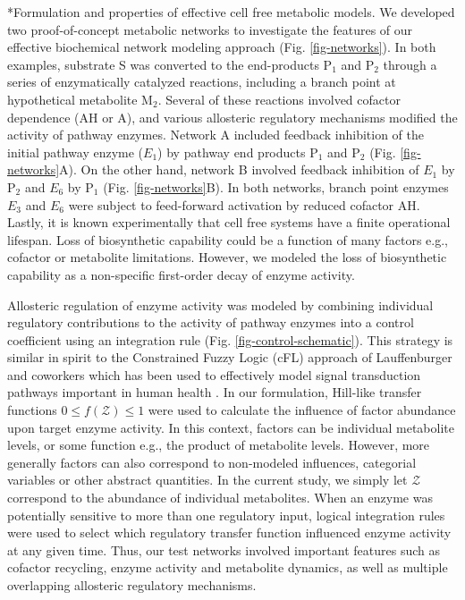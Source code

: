 \documentclass[12pt]{article}
\makeatletter
\renewcommand\subsection{\@startsection
	{subsection}{2}{0mm}
	{-0.05in}
	{-0.5\baselineskip}
	{\normalfont\normalsize\bfseries}}
\makeatother
\begin{document}
\subsection*{Formulation and properties of effective cell free metabolic models.}
We developed two proof-of-concept metabolic networks to investigate the features of our effective biochemical network modeling approach (Fig. \ref{fig-networks}).
In both examples, substrate S was converted to the end-products P$_{1}$ and P$_{2}$ through a series of enzymatically catalyzed reactions, 
including a branch point at hypothetical metabolite M$_{2}$. 
Several of these reactions involved cofactor dependence (AH or A), and various allosteric regulatory mechanisms modified the activity of pathway enzymes. 
Network A included feedback inhibition of the initial pathway enzyme ($E_{1}$) by pathway end products P$_{1}$ and P$_{2}$ (Fig. \ref{fig-networks}A).
On the other hand, network B involved feedback inhibition of $E_{1}$ by P$_{2}$ and $E_{6}$ by P$_{1}$ (Fig. \ref{fig-networks}B). 
In both networks, branch point enzymes $E_{3}$ and $E_{6}$ were subject to feed-forward activation by reduced cofactor AH.
Lastly, it is known experimentally that cell free systems have a finite 
operational lifespan. Loss of biosynthetic capability could be a function of many factors e.g., cofactor or metabolite 
limitations. However, we modeled the loss of biosynthetic capability as a non-specific first-order decay of enzyme activity.

Allosteric regulation of enzyme activity was modeled by combining individual regulatory contributions to
the activity of pathway enzymes into a control coefficient using an integration rule (Fig. \ref{fig-control-schematic}).  
This strategy is similar in spirit to the Constrained Fuzzy Logic (cFL) approach of Lauffenburger 
and coworkers which has been used to effectively model signal transduction pathways important in human health \citep{Morris:2011aa}.
In our formulation, Hill-like transfer functions $0 \leq f\left(\mathcal{Z}\right) \leq 1$ were used to calculate the influence of factor abundance upon target enzyme activity. 
In this context, factors can be individual metabolite levels, or some function e.g., the product of metabolite levels. However, more generally factors can also 
correspond to non-modeled influences, categorial variables or other abstract quantities. 
In the current study, we simply let $\mathcal{Z}$ correspond to the abundance of individual metabolites. 
When an enzyme was potentially sensitive to more than one regulatory input, logical integration rules were used to select which regulatory transfer function influenced enzyme 
activity at any given time. Thus, our test networks involved important features such as cofactor recycling, enzyme activity and metabolite dynamics, 
as well as multiple overlapping allosteric regulatory mechanisms.  
\end{document}
